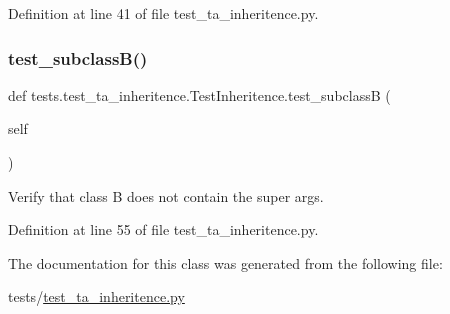 Definition at line 41 of file test\+\_\+ta\+\_\+inheritence.\+py.

\mbox{\label{classtests_1_1test__ta__inheritence_1_1TestInheritence_a3bed049c4393b8c6c8a9afbe550f7893}} 
\subsubsection{\texorpdfstring{test\+\_\+subclass\+B()}{test\_subclassB()}}
{\footnotesize\ttfamily def tests.\+test\+\_\+ta\+\_\+inheritence.\+Test\+Inheritence.\+test\+\_\+subclassB (\begin{DoxyParamCaption}\item[{}]{self }\end{DoxyParamCaption})}

\begin{DoxyVerb}Verify that class B does not contain the super args.\end{DoxyVerb}
 

Definition at line 55 of file test\+\_\+ta\+\_\+inheritence.\+py.



The documentation for this class was generated from the following file\+:\begin{DoxyCompactItemize}
\item 
tests/\hyperlink{test__ta__inheritence_8py}{test\+\_\+ta\+\_\+inheritence.\+py}\end{DoxyCompactItemize}
